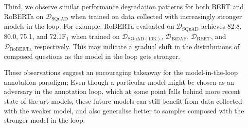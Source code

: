 \documentclass[11pt,a4paper]{article}
\newcommand{\dataset}[1]{\ensuremath{\mathcal{D_{\mathrm{#1}}}}}
\begin{document}
Third, we observe similar performance degradation patterns for both BERT and RoBERTa on \dataset{SQuAD} when trained on data collected with increasingly stronger models in the loop. For example, RoBERTa evaluated on \dataset{SQuAD} achieves 82.8, 80.0, 75.1, and 72.1F$_\text{1}$ when trained on \dataset{SQuAD(10K)}, \dataset{BiDAF}, \dataset{BERT}, and \dataset{RoBERTa} respectively. This may indicate a gradual shift in the distributions of composed questions as the model in the loop gets stronger.


These observations suggest an encouraging takeaway for the model-in-the-loop annotation paradigm: 
Even though a particular model might be chosen as an adversary in the annotation loop, which at some point falls behind more recent state-of-the-art models, these future models can still benefit from data collected with the weaker model, and also generalise better to samples composed with the stronger model in the loop.
\end{document}
